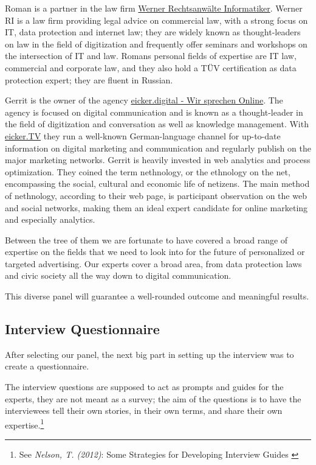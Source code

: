 Roman is a partner in the law firm \href{https://www.werner-ri.de/}{Werner Rechtsanwälte Informatiker}. Werner RI is a law firm providing legal advice on commercial law, with a strong focus on IT, data protection and internet law; they are widely known as thought-leaders on law in the field of digitization and frequently offer seminars and workshops on the intersection of IT and law. Romans personal fields of expertise are IT law, commercial and corporate law, and they also hold a TÜV certification as data protection expert; they are fluent in Russian.

Gerrit is the owner of the agency \href{https://eicker.digital/}{eicker.digital - Wir sprechen Online}. The agency is focused on digital communication and is known as a thought-leader in the field of digitization and conversation as well as knowledge management. With \href{https://www.youtube.com/eickertv}{eicker.TV} they run a well-known German-language channel for up-to-date information on digital marketing and communication and regularly publish on the major marketing networks. Gerrit is heavily invested in web analytics and process optimization. They coined the term nethnology, or the ethnology on the net, encompassing the social, cultural and economic life of netizens. The main method of nethnology, according to their web page, is participant observation on the web and social networks, making them an ideal expert candidate for online marketing and especially analytics.

Between the tree of them we are fortunate to have covered a broad range of expertise on the fields that we need to look into for the future of personalized or targeted advertising. Our experts cover a broad area, from data protection laws and civic society all the way down to digital communication. 

This diverse panel will guarantee a well-rounded outcome and meaningful results.

\subsection{Interview Questionnaire}

After selecting our panel, the next big part in setting up the interview was to create a questionnaire.

The interview questions are supposed to act as prompts and guides for the experts, they are not meant as a survey; the aim of the questions is to have the interviewees tell their own stories, in their own terms, and share their own expertise.\footnote{See \textit{Nelson, T. (2012)}: Some Strategies for Developing Interview Guides \cite{qualiStrategies}}

